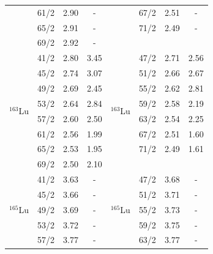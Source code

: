 \begin{table}
\begin{tabular}{|c|c|c|c|c|ccc|}
    \multicolumn{1}{|c|}{} & 61/2 & \multicolumn{1}{c|}{2.90} & - & \multicolumn{1}{c|}{} & \multicolumn{1}{c|}{67/2} & \multicolumn{1}{c|}{2.51} & - \\ \cline{2-4} \cline{6-8} 
    \multicolumn{1}{|c|}{} & 65/2 & \multicolumn{1}{c|}{2.91} & - & \multicolumn{1}{c|}{} & \multicolumn{1}{c|}{71/2} & \multicolumn{1}{c|}{2.49} & - \\ \cline{2-4} \cline{6-8} 
    \multicolumn{1}{|c|}{} & 69/2 & \multicolumn{1}{c|}{2.92} & - & \multicolumn{1}{c|}{} & \multicolumn{3}{c|}{} \\ \hline
    \multirow{8}{*}{$^{163}$Lu} & 41/2 & 2.80 & 3.45 & \multirow{8}{*}{$^{163}$Lu} & \multicolumn{1}{c|}{47/2} & \multicolumn{1}{c|}{2.71} & 2.56 \\ \cline{2-4} \cline{6-8} 
    & 45/2 & 2.74 & 3.07 &  & \multicolumn{1}{c|}{51/2} & \multicolumn{1}{c|}{2.66} & 2.67 \\ \cline{2-4} \cline{6-8} 
    & 49/2 & 2.69 & 2.45 &  & \multicolumn{1}{c|}{55/2} & \multicolumn{1}{c|}{2.62} & 2.81 \\ \cline{2-4} \cline{6-8} 
    & 53/2 & 2.64 & 2.84 &  & \multicolumn{1}{c|}{59/2} & \multicolumn{1}{c|}{2.58} & 2.19 \\ \cline{2-4} \cline{6-8} 
    & 57/2 & 2.60 & 2.50 &  & \multicolumn{1}{c|}{63/2} & \multicolumn{1}{c|}{2.54} & 2.25 \\ \cline{2-4} \cline{6-8} 
    & 61/2 & 2.56 & 1.99 &  & \multicolumn{1}{c|}{67/2} & \multicolumn{1}{c|}{2.51} & 1.60 \\ \cline{2-4} \cline{6-8} 
    & 65/2 & 2.53 & 1.95 &  & \multicolumn{1}{c|}{71/2} & \multicolumn{1}{c|}{2.49} & 1.61 \\ \cline{2-4} \cline{6-8} 
    & 69/2 & 2.50 & 2.10 &  & \multicolumn{3}{c|}{}                                        \\ \hline
    \multirow{8}{*}{$^{165}$Lu} & 41/2 & 3.63 & - & \multirow{8}{*}{$^{165}$Lu} & \multicolumn{1}{c|}{47/2} & \multicolumn{1}{c|}{3.68} & - \\ \cline{2-4} \cline{6-8} 
    & 45/2 & 3.66 & - &  & \multicolumn{1}{c|}{51/2} & \multicolumn{1}{c|}{3.71} & - \\ \cline{2-4} \cline{6-8} 
    & 49/2 & 3.69 & - &  & \multicolumn{1}{c|}{55/2} & \multicolumn{1}{c|}{3.73} & - \\ \cline{2-4} \cline{6-8} 
    & 53/2 & 3.72 & - &  & \multicolumn{1}{c|}{59/2} & \multicolumn{1}{c|}{3.75} & - \\ \cline{2-4} \cline{6-8} 
    & 57/2 & 3.77 & - &  & \multicolumn{1}{c|}{63/2} & \multicolumn{1}{c|}{3.77} & - \\ \cline{2-4} \cline{6-8} 

\end{tabular}
\end{table}

